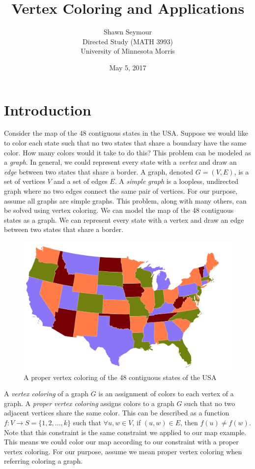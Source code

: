 \documentclass{article}
\title{\vspace{-0.8cm}Vertex Coloring and Applications}
\date{May 5, 2017}
\author{\Large{Shawn Seymour\vspace{0.2cm}}\\Directed Study (MATH 3993)\\University of Minnesota Morris}
\theoremstyle{definition}
\begin{document}
\maketitle

\setlength{\parskip}{0.3cm}

\section{Introduction}
Consider the map of the 48 contiguous states in the USA. Suppose we would like to color each state such that no two states that share a boundary have the same color. How many colors would it take to do this? This problem can be modeled as a \emph{graph}. In general, we could represent every state with a \emph{vertex} and draw an \emph{edge} between two states that share a border. A graph, denoted $G = (V, E)$, is a set of vertices $V$ and a set of edges $E$. A \emph{simple graph} is a loopless, undirected graph where no two edges connect the same pair of vertices. For our purpose, assume all graphs are simple graphs. This problem, along with many others, can be solved using vertex coloring. We can model the map of the 48 contiguous states as a graph. We can represent every state with a vertex and draw an edge between two states that share a border.

\begin{figure}[H]
\centering
\includegraphics[width=0.7\linewidth]{figures/map-colors.pdf}
\caption{A proper vertex coloring of the 48 contiguous states of the USA}\label{fig:map}
\end{figure}

A \emph{vertex coloring} of a graph $G$ is an assignment of colors to each vertex of a graph. A \emph{proper vertex coloring} assigns colors to a graph $G$ such that no two adjacent vertices share the same color. This can be described as a function $f : V \rightarrow S = \{1, 2, \ldots, k\}$ such that $\forall u,w \in V$, if $(u,w) \in E$, then $f(u) \neq f(w)$. Note that this constraint is the same constraint we applied to our map example. This means we could color our map according to our constraint with a proper vertex coloring. For our purpose, assume we mean proper vertex coloring when referring coloring a graph.
\end{document}
